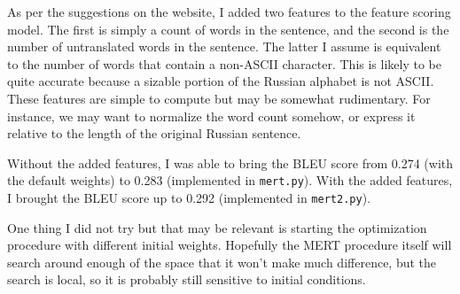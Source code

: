 \documentclass[11pt, oneside]{article}      %
\begin{document}
As per the suggestions on the website, I added two features to the feature scoring model.  The first is simply a count of words in the sentence, and the second is the number of untranslated words in the sentence.  The latter I assume is equivalent to the number of words that contain a non-ASCII character.  This is likely to be quite accurate because a sizable portion of the Russian alphabet is not ASCII.  These features are simple to compute but may be somewhat rudimentary.  For instance, we may want to normalize the word count somehow, or express it relative to the length of the original Russian sentence.

Without the added features, I was able to bring the BLEU score from 0.274 (with the default weights) to 0.283 (implemented in \texttt{mert.py}).  With the added features, I brought the BLEU score up to 0.292 (implemented in \texttt{mert2.py}).

One thing I did not try but that may be relevant is starting the optimization procedure with different initial weights.  Hopefully the MERT procedure itself will search around enough of the space that it won't make much difference, but the search is local, so it is probably still sensitive to initial conditions.
\end{document}
